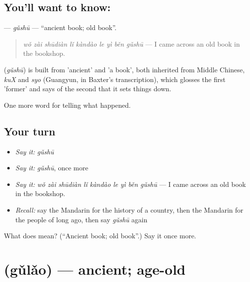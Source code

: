 \subsection*{You'll want to know: }
\textbf{} — \emph{gǔshū} — \textquotedblleft{}ancient book; old book\textquotedblright{}.

\begin{quote}
\textbf{} \emph{wǒ zài shūdiàn lǐ kàndào le yì běn gǔshū} — I came across an old book in the bookshop.
\end{quote}

\begin{cousinweb}
\textbf{} (\emph{gǔshū}) is built from  'ancient' and  'a book', both inherited from Middle Chinese, \emph{kuX} and \emph{syo} (Guangyun, in Baxter's transcription), which glosses the first 'former' and says of the second that it sets things down.
\end{cousinweb}

\begin{grammarlens}[title={What you've built}]
One more word for telling what happened.
\end{grammarlens}

\subsection*{Your turn}
\begin{itemize}
\raggedright
  \item \emph{Say it:} \emph{gǔshū}
  \item \emph{Say it:} \emph{gǔshū}, once more
  \item \emph{Say it:} \emph{wǒ zài shūdiàn lǐ kàndào le yì běn gǔshū} — I came across an old book in the bookshop.
  \item \emph{Recall:} say the Mandarin for the history of a country, then the Mandarin for the people of long ago, then say \emph{gǔshū} again
\end{itemize}

\begin{tcolorbox}[breakable,colback=teal!4,colframe=teal!35!black,title={Before you move on}]
What does  mean? (\textquotedblleft{}Ancient book; old book\textquotedblright{}.) Say it once more.
\end{tcolorbox}
\section[\texorpdfstring{\zh{古老} (gǔlǎo)}{古老 (gǔlǎo)}]{ (gǔlǎo) — ancient; age-old}

